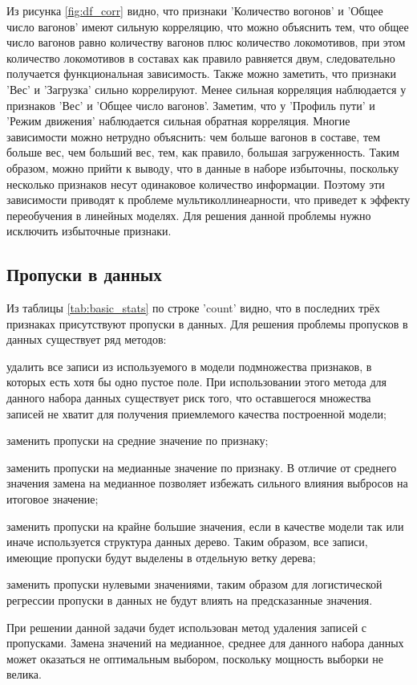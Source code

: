 Из рисунка \ref{fig:df_corr} видно, что признаки 'Количество вогонов' и 'Общее число вагонов' имеют сильную корреляцию, что можно объяснить тем, что общее число вагонов равно количеству вагонов плюс количество локомотивов, при этом количество локомотивов в составах как правило равняется двум, следовательно получается функциональная зависимость. Также можно заметить, что признаки 'Вес' и 'Загрузка' сильно коррелируют. Менее сильная корреляция наблюдается у признаков 'Вес' и 'Общее число вагонов'. Заметим, что у 'Профиль пути' и 'Режим движения' наблюдается сильная обратная корреляция. Многие зависимости можно нетрудно объяснить: чем больше вагонов в составе, тем больше вес, чем больший вес, тем, как правило, большая загруженность. Таким образом, можно прийти к выводу, что в данные в наборе избыточны, поскольку несколько признаков несут одинаковое количество информации. Поэтому эти зависимости приводят к проблеме мультиколлинеарности, что приведет к эффекту переобучения в линейных моделях. Для решения данной проблемы нужно исключить избыточные признаки.



\subsection{Пропуски в данных}

Из таблицы \ref{tab:basic_stats} по строке 'count' видно, что в последних трёх признаках присутствуют пропуски в данных. Для решения проблемы пропусков в данных существует ряд методов:

\begin{description}[font=$\bullet$]
    \item удалить все записи из используемого в модели подмножества признаков, в которых есть хотя бы одно пустое поле. При использовании этого метода для данного набора данных существует риск того, что оставшегося множества записей не хватит для получения приемлемого качества построенной модели;
    \item заменить пропуски на средние значение по признаку;
    \item заменить пропуски на медианные значение по признаку. В отличие от среднего значения замена на медианное позволяет избежать сильного влияния выбросов на итоговое значение;
    \item заменить пропуски на крайне большие значения, если в качестве модели так или иначе используется структура данных дерево. Таким образом, все записи, имеющие пропуски будут выделены в отдельную ветку дерева;
    \item заменить пропуски нулевыми значениями, таким образом для логистической регрессии пропуски в данных не будут влиять на предсказанные значения.
\end{description}
При решении данной задачи будет использован метод удаления записей с пропусками. Замена значений на медианное, среднее для данного набора данных может оказаться не оптимальным выбором, поскольку мощность выборки не велика.



